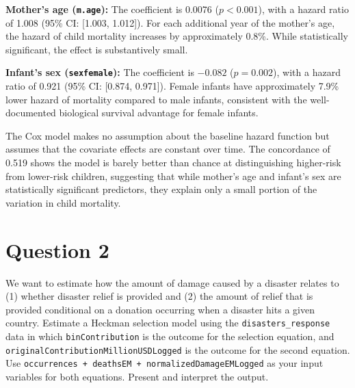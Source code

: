 \documentclass[12pt,letterpaper]{article}
\begin{document}
\textbf{Mother's age (\texttt{m.age}):} The coefficient is 0.0076 ($p < 0.001$), with a hazard ratio of 1.008 (95\% CI: [1.003, 1.012]). For each additional year of the mother's age, the hazard of child mortality increases by approximately 0.8\%. While statistically significant, the effect is substantively small.

\textbf{Infant's sex (\texttt{sexfemale}):} The coefficient is $-0.082$ ($p = 0.002$), with a hazard ratio of 0.921 (95\% CI: [0.874, 0.971]). Female infants have approximately 7.9\% lower hazard of mortality compared to male infants, consistent with the well-documented biological survival advantage for female infants.

The Cox model makes no assumption about the baseline hazard function but assumes that the covariate effects are constant over time. The concordance of 0.519 shows the model is barely better than chance at
distinguishing higher-risk from lower-risk children, suggesting that while mother's age and infant's sex are statistically significant predictors, they explain only a small portion of the variation in child mortality.

\newpage
\section*{Question 2}
\vspace{.25cm}
\noindent We want to estimate how the amount of damage caused by a disaster relates to (1) whether disaster relief is provided and (2) the amount of relief that is provided conditional on a donation occurring when a disaster hits a given country. Estimate a Heckman selection model using the \texttt{disasters\_response} data in which \texttt{binContribution} is the outcome for the selection equation, and \texttt{originalContributionMillionUSDLogged} is the outcome for the second equation. Use \texttt{occurrences + deathsEM + normalizedDamageEMLogged} as your input variables for both equations. Present and interpret the output.

\vspace{.5cm}


\vspace{.5cm}


\vspace{.5cm}

\vspace{.5cm}

\end{document}
